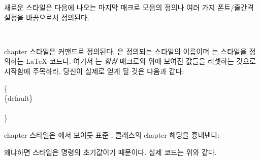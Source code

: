 
새로운 스타일은 다음에 나오는 마지막 매크로 모음의 정의나
여러 가지 폰트/줄간격 설정을 바꿈으로서 정의된다.

\begin{syntax}
\cmd{\makechapterstyle} \\
\end{syntax}
chapter 스타일은 \cmd{\makechapterstyle} 커맨드로 정의된다.
은 정의되는 스타일의 이름이며 는 스타일을 정의하는
LaTeX 코드다.
여기서 는 \emph{항상} 매크로와 위에 보여진 값들을 리셋하는 것으로
시작함에 주목하라.
당신이 실제로 얻게 될 것은 다음과 같다:
\begin{syntax}
\cmd{\makechapterstyle}\{\\
  \cmd{\chapterstyle}\{default\}\\
  \\
\} 
\end{syntax}


 chapter 스타일은  에서 보이듯
표준 ,  클래스의 chapter 헤딩을 흉내낸다:
\begin{lcode}
\end{lcode}
왜냐하면  스타일은 \cmd{\makechapterstyle} 명령의
초기값이기 때문이다. 실제 코드는 위와 같다.



